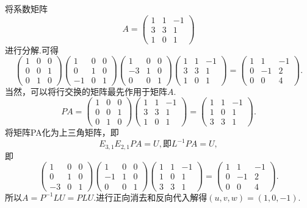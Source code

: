 ﻿\documentclass{book} \usepackage{exsheets} \usepackage{xeCJK}
\begin{document}
\begin{solution}
  将系数矩阵
$$
A=
\begin{pmatrix}
  1&1&-1\\
  3&3&1\\
  1&0&1
\end{pmatrix}
$$
进行分解.可得
$$
\begin{pmatrix}
  1&0&0\\
  0&0&1\\
  0&1&0
\end{pmatrix}
\begin{pmatrix}
  1&0&0\\
  0&1&0\\
  -1&0&1
\end{pmatrix}
\begin{pmatrix}
  1&0&0\\
  -3&1&0\\
  0&0&1
\end{pmatrix}
\begin{pmatrix}
  1&1&-1\\
  3&3&1\\
  1&0&1
\end{pmatrix}=
\begin{pmatrix}
  1&1&-1\\
  0&-1&2\\
  0&0&4
\end{pmatrix}.
$$
当然，可以将行交换的矩阵最先作用于矩阵$A$.
$$
PA=
\begin{pmatrix}
  1&0&0\\
  0&0&1\\
  0&1&0
\end{pmatrix}
\begin{pmatrix}
  1&1&-1\\
  3&3&1\\
  1&0&1
\end{pmatrix}=
\begin{pmatrix}
  1&1&-1\\
  1&0&1\\
  3&3&1
\end{pmatrix}.
$$
将矩阵PA化为上三角矩阵，即
$$
E_{3,1}E_{2,1}PA=U,\mbox{即}L^{-1}PA=U,
$$
即
$$
\begin{pmatrix}
  1&0&0\\
  0&1&0\\
  -3&0&1
\end{pmatrix}
\begin{pmatrix}
  1&0&0\\
  -1&1&0\\
  0&0&1
\end{pmatrix}
\begin{pmatrix}
  1&1&-1\\
  1&0&1\\
  3&3&1
\end{pmatrix}=
\begin{pmatrix}
  1&1&-1\\
  0&-1&2\\
  0&0&4
\end{pmatrix}.
$$
所以$A=P^{-1}LU=PLU$.进行正向消去和反向代入解得$(u,v,w)=(1,0,-1)$.
\end{solution}
\end{document}
